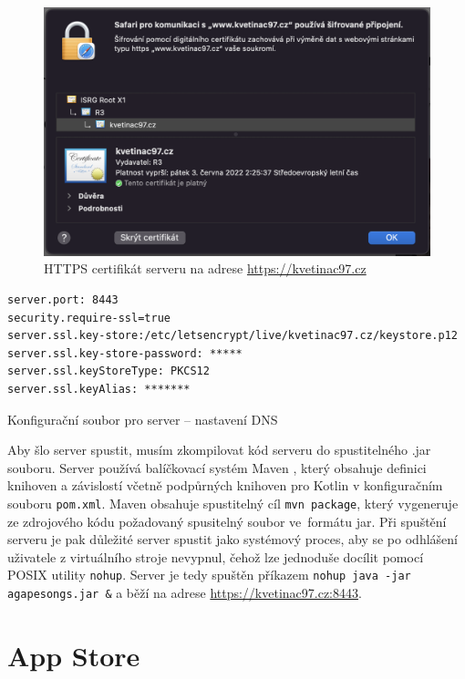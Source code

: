 \begin{figure}[H]
    \includegraphics[width=\textwidth]{images/7-nasazeni/7-2-https-server.png}
    \caption[HTTPS certifikát serveru]{HTTPS certifikát serveru na adrese \url{https://kvetinac97.cz}}
\end{figure}

\begin{listing}[H]
\begin{verbatim}
server.port: 8443
security.require-ssl=true
server.ssl.key-store:/etc/letsencrypt/live/kvetinac97.cz/keystore.p12
server.ssl.key-store-password: *****
server.ssl.keyStoreType: PKCS12
server.ssl.keyAlias: *******
\end{verbatim}
\caption{Konfigurační soubor pro server -- nastavení DNS}
\end{listing}

Aby šlo server spustit, musím zkompilovat kód serveru do spustitelného .jar souboru. Server používá balíčkovací systém Maven \cite{maven}, který obsahuje definici knihoven a závislostí včetně podpůrných knihoven pro Kotlin v konfiguračním souboru \texttt{pom.xml}. Maven obsahuje spustitelný cíl \texttt{mvn package}, který vygeneruje ze zdrojového kódu požadovaný spusitelný soubor ve~formátu jar. Při spuštění serveru je pak důležité server spustit jako systémový proces, aby se po odhlášení uživatele z virtuálního stroje nevypnul, čehož lze jednoduše docílit pomocí POSIX utility \texttt{nohup}. Server je tedy spuštěn příkazem \texttt{nohup java -jar agapesongs.jar \&} a běží na adrese \url{https://kvetinac97.cz:8443}.

\section{App Store}


